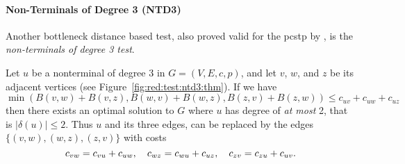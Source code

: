 \paragraph{Non-Terminals of Degree 3 (NTD3)}\label{sec:red:test:deg3}
Another bottleneck distance based test,
also proved valid for the \gls{pcstp} by \citet{uchoa2006reduction},
is the \textit{non-terminals of degree 3 test}.
\begin{theorem}\label{thm:ntd3}
  Let $u$ be a nonterminal of degree 3 in $G = (V, E, c, p)$,
  and let $v$, $w$, and $z$ be its adjacent
  vertices (see Figure~\ref{fig:red:test:ntd3:thm}). If we have
  $$\min\left(B(v,w) + B(v,z), B(w,v) + B(w,z),  B(z, v)+ B(z, w)\right) \leq
  c_{uv} + c_{uw} + c_{uz}$$
  then there exists an optimal solution to $G$ where $u$ has degree of
  \textit{at most} 2, that is $|\delta(u)| \leq 2$. Thus $u$ and its three edges, can be replaced by
  the edges $\{(v, w), (w,z), (z,v)\}$ with costs
  \[c_{vw} = c_{vu} + c_{uw},\quad c_{wz} = c_{wu} + c_{uz},\quad c_{zv} = c_{zu} + c_{uv}\mathnormal{.}\]
\end{theorem}
